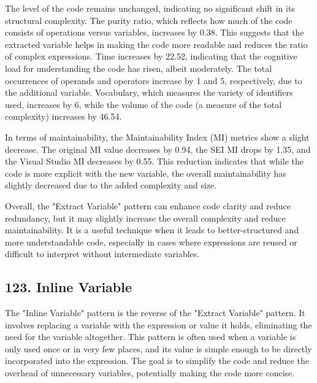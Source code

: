 The level of the code remains unchanged, indicating no significant shift in its structural complexity. The purity ratio, which reflects how much of the code consists of operations versus variables, increases by 0.38. This suggests that the extracted variable helps in making the code more readable and reduces the ratio of complex expressions. Time increases by 22.52, indicating that the cognitive load for understanding the code has risen, albeit moderately. The total occurrences of operands and operators increase by 1 and 5, respectively, due to the additional variable. Vocabulary, which measures the variety of identifiers used, increases by 6, while the volume of the code (a measure of the total complexity) increases by 46.54.

In terms of maintainability, the Maintainability Index (MI) metrics show a slight decrease. The original MI value decreases by 0.94, the SEI MI drops by 1.35, and the Visual Studio MI decreases by 0.55. This reduction indicates that while the code is more explicit with the new variable, the overall maintainability has slightly decreased due to the added complexity and size.

Overall, the "Extract Variable" pattern can enhance code clarity and reduce redundancy, but it may slightly increase the overall complexity and reduce maintainability. It is a useful technique when it leads to better-structured and more understandable code, especially in cases where expressions are reused or difficult to interpret without intermediate variables.

\subsection{123. Inline Variable}

The "Inline Variable" pattern is the reverse of the "Extract Variable" pattern. It involves replacing a variable with the expression or value it holds, eliminating the need for the variable altogether. This pattern is often used when a variable is only used once or in very few places, and its value is simple enough to be directly incorporated into the expression. The goal is to simplify the code and reduce the overhead of unnecessary variables, potentially making the code more concise.

